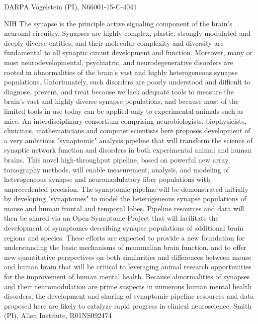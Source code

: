 \documentclass[10pt,colorlinks=true,urlcolor=blue]{moderncv}
\begin{document}
    {DARPA}
    {}
    {Vogelstein (PI), N66001-15-C-4041}{}

    {NIH}
    {
    The synapse is the principle active signaling component of the brain's neuronal circuitry. Synapses are highly complex, plastic, strongly modulated and deeply diverse entities, and their molecular complexity and diversity are fundamental to all synaptic circuit development and function. Moreover, many or most neurodevelopmental, psychiatric, and neurodegenerative disorders are rooted in abnormalities of the brain's vast and highly heterogeneous synapse populations. Unfortunately, such disorders are poorly understood and difficult to diagnose, prevent, and treat because we lack adequate tools to measure the brain's vast and highly diverse synapse populations, and because most of the limited tools in use today can be applied only to experimental animals such as mice. An interdisciplinary consortium comprising neurobiologists, biophysicists, clinicians, mathematicians and computer scientists here proposes development of a very ambitious "synaptomic" analysis pipeline that will transform the science of synaptic network function and disorders in both experimental animal and human brains. This novel high-throughput pipeline, based on powerful new array tomography methods, will enable measurement, analysis, and modeling of heterogeneous synapse and neuromodulatory fiber populations with unprecedented precision. The synaptomic pipeline will be demonstrated initially by developing "synaptomes" to model the heterogeneous synapse populations of mouse and human frontal and temporal lobes. Pipeline resources and data will then be shared via an Open Synaptome Project that will facilitate the development of synaptomes describing synapse populations of additional brain regions and species. These efforts are expected to provide a new foundation for understanding the basic mechanisms of mammalian brain function, and to offer new quantitative perspectives on both similarities and differences between mouse and human brain that will be critical to leveraging animal research opportunities for the improvement of human mental health. Because abnormalities of synapses and their neuromodulation are prime suspects in numerous human mental health disorders, the development and sharing of synaptomic pipeline resources and data proposed here are likely to catalyze rapid progress in clinical neuroscience.
    }
    {Smith (PI), Allen Institute, R01NS092474}{}
\end{document}
